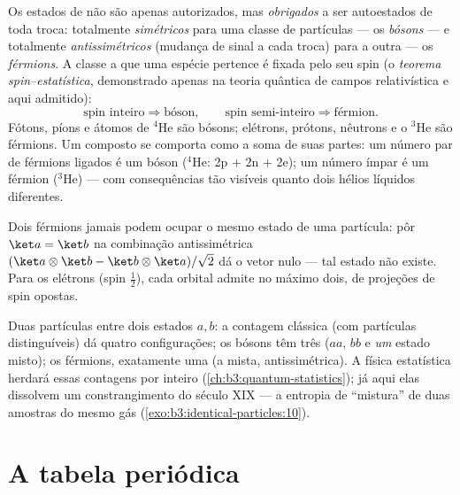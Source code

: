 \begin{theorem}\label{thm:b3:identical-particles:postulate}
Os estados de  não são apenas autorizados, mas
\emph{obrigados} a ser autoestados de toda troca: totalmente
\emph{simétricos} para uma classe de partículas --- os \emph{bósons} ---
e totalmente \emph{antissimétricos} (mudança de sinal a cada troca)
para a outra --- os \emph{férmions}. A classe a que uma espécie
pertence é fixada pelo seu spin (o \emph{teorema spin--estatística},
demonstrado apenas na teoria quântica de campos relativística e aqui
admitido):
\[
\text{spin inteiro} \Rightarrow \text{bóson} , \qquad
\text{spin semi-inteiro} \Rightarrow \text{férmion} .
\]
Fótons, píons e átomos de $^4$He são bósons; elétrons, prótons,
nêutrons e o $^3$He são férmions.
Um composto se comporta como a soma de suas partes: um número par de
férmions ligados é um bóson ($^4$He: 2p + 2n + 2e); um número ímpar é
um férmion ($^3$He) --- com consequências tão visíveis quanto dois
hélios líquidos diferentes.
\end{theorem}
\admitted

\begin{corollary}\label{cor:b3:identical-particles:pauli}
Dois férmions jamais podem ocupar o mesmo estado de uma partícula: pôr
$\ket a = \ket b$ na combinação antissimétrica
$(\ket a\otimes\ket b - \ket b\otimes\ket a)/\sqrt2$ dá o vetor nulo
--- tal estado não existe. Para os elétrons (spin $\tfrac12$), cada
orbital admite no máximo dois, de projeções de spin opostas.
\end{corollary}

\begin{example}\label{ex:b3:identical-particles:counting}
Duas partículas entre dois estados $a, b$: a contagem clássica (com
partículas distinguíveis) dá quatro configurações; os bósons têm três
($aa$, $bb$ e \emph{um} estado misto); os férmions, exatamente uma (a
mista, antissimétrica). A física estatística herdará essas contagens
por inteiro (\cref{ch:b3:quantum-statistics}); já aqui elas dissolvem
um constrangimento do século XIX --- a entropia de ``mistura'' de duas
amostras do mesmo gás (\cref{exo:b3:identical-particles:10}).
\end{example}

\section{A tabela periódica}

